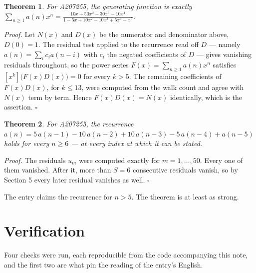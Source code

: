 \documentclass[11pt]{article}
\newtheorem{theorem}{Theorem}
\theoremstyle{definition}
\begin{document}
\begin{theorem} For A207255, the generating function is exactly $\sum_{n\ge 1} a(n)x^n = \frac{10x + 50x^{2} - 30x^{3} - 10x^{4}}{1 - 5x + 10x^{2} - 10x^{3} + 5x^{4} - x^{5}}$.\end{theorem}

{\itshape Proof.} Let $N(x)$ and $D(x)$ be the numerator and denominator above, $D(0)=1$. The residual test applied to the recurrence read off $D$ --- namely $a(n) = \sum_i c_i a(n-i)$ with $c_i$ the negated coefficients of $D$ --- gives vanishing residuals throughout, so the power series $F(x)=\sum_{n\ge 1}a(n)x^n$ satisfies $[x^k]\bigl(F(x)D(x)\bigr) = 0$ for every $k > 5$. The remaining coefficients of $F(x)D(x)$, for $k \le 13$, were computed from the walk count and agree with $N(x)$ term by term. Hence $F(x)D(x) = N(x)$ identically, which is the assertion. $\square$

\begin{theorem} For A207255, the recurrence $a(n) = 5\,a(n-1) - 10\,a(n-2) + 10\,a(n-3) - 5\,a(n-4) + a(n-5)$ holds for every $n \ge 6$ --- at every index at which it can be stated.\end{theorem}

{\itshape Proof.} The residuals $u_m$ were computed exactly for $m = 1,\dots,50$. Every one of them vanished. After it, more than $S = 6$ consecutive residuals vanish, so by Section 5 every later residual vanishes as well. $\square$

The entry claims the recurrence for $n > 5$. The theorem is at least as strong.

\section{Verification}

Four checks were run, each reproducible from the code accompanying this note, and the first two are what pin the reading of the entry's English.
\end{document}
